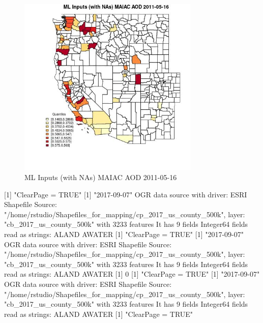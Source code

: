 \begin{figure} 
\centering  
\includegraphics[width=0.77\textwidth]{Code_Outputs/Report_ML_input_PM25_Step4_part_e_de_duplicated_aveswNAs_CountyMAIAC_AODMean2011-05-16_2011-05-16.jpg} 
\caption{\label{fig:Report_ML_input_PM25_Step4_part_e_de_duplicated_aveswNAsCountyMAIAC_AODMean2011-05-16_2011-05-16}ML Inputs (with NAs) MAIAC AOD 2011-05-16} 
\end{figure} 
 
[1] "ClearPage =  TRUE"
[1] "2017-09-07"
OGR data source with driver: ESRI Shapefile 
Source: "/home/rstudio/Shapefiles_for_mapping/cp_2017_us_county_500k", layer: "cb_2017_us_county_500k"
with 3233 features
It has 9 fields
Integer64 fields read as strings:  ALAND AWATER 
[1] "ClearPage =  TRUE"
[1] "2017-09-07"
OGR data source with driver: ESRI Shapefile 
Source: "/home/rstudio/Shapefiles_for_mapping/cp_2017_us_county_500k", layer: "cb_2017_us_county_500k"
with 3233 features
It has 9 fields
Integer64 fields read as strings:  ALAND AWATER 
[1] 0
[1] "ClearPage =  TRUE"
[1] "2017-09-07"
OGR data source with driver: ESRI Shapefile 
Source: "/home/rstudio/Shapefiles_for_mapping/cp_2017_us_county_500k", layer: "cb_2017_us_county_500k"
with 3233 features
It has 9 fields
Integer64 fields read as strings:  ALAND AWATER 
[1] "ClearPage =  TRUE"
